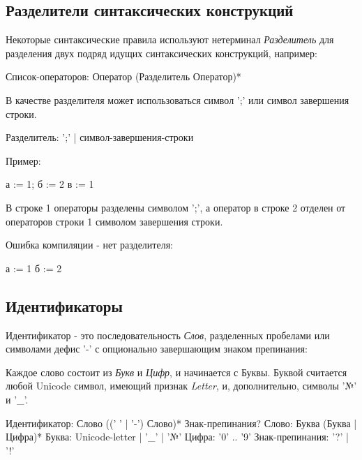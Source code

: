 \hypertarget{separators}{%
\subsection{Разделители синтаксических конструкций}\label{lex:separators}}

Некоторые синтаксические правила используют нетерминал \emph{Разделитель} для разделения двух подряд идущих синтаксических конструкций, например:
\begin{Grammar}
Список-операторов: Оператор (Разделитель Оператор)* 
\end{Grammar}

В качестве разделителя может использоваться символ ';' или символ завершения строки.
\begin{Grammar}
Разделитель: ';'  | символ-завершения-строки
\end{Grammar}

\begin{samepage}
Пример:
\begin{Trivil}[vspace=2pt]
а := 1; б := 2
в := 1 
\end{Trivil}
\end{samepage}

В строке 1 операторы разделены символом ';', а оператор в строке 2 отделен от операторов строки 1 символом завершения строки.

Ошибка компиляции - нет разделителя:
\begin{SampleErr}[vspace=2pt]
а := 1 б := 2
\end{SampleErr}

\hypertarget{idents}{%
\subsection{Идентификаторы}\label{lex:idents}}

Идентификатор - это последовательность \emph{Слов}, разделенных пробелами или символами дефис '-' с опционально завершающим знаком препинания:

Каждое слово состоит из \emph{Букв} и \emph{Цифр}, и начинается с Буквы. Буквой считается любой Unicode символ, имеющий признак \emph{Letter}, и, дополнительно, символы '№'
и '\_'. 

\begin{Grammar}
Идентификатор: Слово ((' ' | '-') Слово)* Знак-препинания?
Слово: Буква (Буква | Цифра)*
Буква: Unicode-letter | '_' | '№'
Цифра: '0' .. '9'
Знак-препинания: '?' | '!' 
\end{Grammar}

